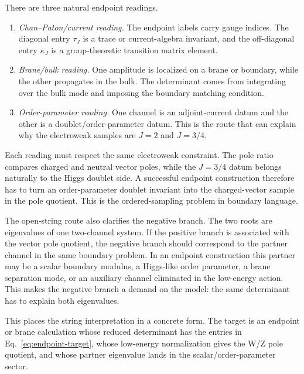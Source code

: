 There are three natural endpoint readings.
\begin{enumerate}
\item \emph{Chan--Paton/current reading.}  The endpoint labels carry gauge indices.  The diagonal entry \(\tau_J\) is a trace or current-algebra invariant, and the off-diagonal entry \(\kappa_J\) is a group-theoretic transition matrix element.
\item \emph{Brane/bulk reading.}  One amplitude is localized on a brane or boundary, while the other propagates in the bulk.  The determinant comes from integrating over the bulk mode and imposing the boundary matching condition.
\item \emph{Order-parameter reading.}  One channel is an adjoint-current datum and the other is a doublet/order-parameter datum.  This is the route that can explain why the electroweak samples are \(J=2\) and \(J=3/4\).
\end{enumerate}

Each reading must respect the same electroweak constraint.  The pole ratio compares charged and neutral vector poles, while the \(J=3/4\) datum belongs naturally to the Higgs doublet side.  A successful endpoint construction therefore has to turn an order-parameter doublet invariant into the charged-vector sample in the pole quotient.  This is the ordered-sampling problem in boundary language.

The open-string route also clarifies the negative branch.  The two roots are eigenvalues of one two-channel system.  If the positive branch is associated with the vector pole quotient, the negative branch should correspond to the partner channel in the same boundary problem.  In an endpoint construction this partner may be a scalar boundary modulus, a Higgs-like order parameter, a brane separation mode, or an auxiliary channel eliminated in the low-energy action.  This makes the negative branch a demand on the model: the same determinant has to explain both eigenvalues.

This places the string interpretation in a concrete form.  The target is an endpoint or brane calculation whose reduced determinant has the entries in Eq.~\eqref{eq:endpoint-target}, whose low-energy normalization gives the W/Z pole quotient, and whose partner eigenvalue lands in the scalar/order-parameter sector.
